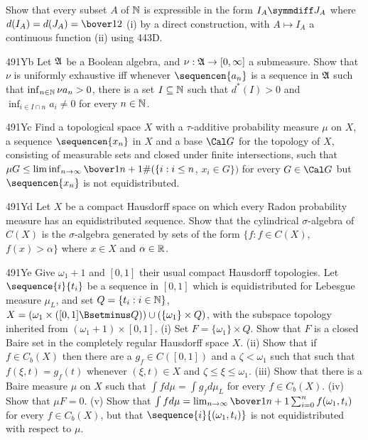 {
Show that every subset $A$ of $\Bbb N$ is expressible in
the form $I_A\symmdiff J_A$ where $d(I_A)=d(J_A)=\bover12$ (i) by a
direct construction, with
$A\mapsto I_A$ a continuous function (ii) using 443D.

\spheader 491Yb Let $\frak A$ be a Boolean algebra, and
$\nu:\frak A\to[0,\infty]$ a submeasure.   Show that $\nu$ is uniformly
exhaustive iff whenever $\sequencen{a_n}$ is a sequence in $\frak A$ such
that $\inf_{n\in\Bbb N}\nu a_n>0$, there is a set $I\subseteq\Bbb N$ such
that $d^*(I)>0$ and $\inf_{i\in I\cap n}a_i\ne 0$ for every $n\in\Bbb N$.

\spheader 491Yc
Find a topological space $X$ with a $\tau$-additive probability
measure
$\mu$ on $X$, a sequence $\sequencen{x_n}$ in $X$ and a base $\Cal G$
for the topology of
$X$, consisting of measurable sets and closed under finite
intersections, such that
$\mu G\le\liminf_{n\to\infty}\bover1{n+1}\#(\{i:i\le n$, $x_i\in G\})$
for every $G\in\Cal G$ but $\sequencen{x_n}$ is not equidistributed.

\spheader 491Yd Let $X$ be a compact Hausdorff space on which every
Radon probability measure has an equidistributed sequence.   Show that
the cylindrical $\sigma$-algebra of
$C(X)$ is the $\sigma$-algebra generated by sets of the form
$\{f:f\in C(X)$, $f(x)>\alpha\}$ where $x\in X$ and $\alpha\in\Bbb R$.

\spheader 491Ye Give $\omega_1+1$ and $[0,1]$ their usual compact
Hausdorff topologies.   Let $\sequence{i}{t_i}$ be a sequence in
$[0,1]$
which is equidistributed for
Lebesgue measure $\mu_L$, and set $Q=\{t_i:i\in\Bbb N\}$,
$X=(\omega_1\times([0,1]\Bsetminus Q))\cup(\{\omega_1\}\times Q)$,
with the subspace topology inherited from $(\omega_1+1)\times[0,1]$.
(i) Set $F=\{\omega_1\}\times Q$.   Show that
$F$ is a closed Baire set in the completely regular Hausdorff space
$X$.
(ii) Show that if $f\in C_b(X)$ then there are a $g_f\in C([0,1])$
and a
$\zeta<\omega_1$ such that
such that $f(\xi,t)=g_f(t)$ whenever $(\xi,t)\in X$ and
$\zeta\le\xi\le\omega_1$.   (iii) Show that there is a Baire measure
$\mu$ on $X$ such that $\int fd\mu=\int g_fd\mu_L$ for every
$f\in C_b(X)$.   (iv) Show that $\mu F=0$.   (v) Show that
$\int fd\mu=\lim_{n\to\infty}\bover1{n+1}\sum_{i=0}^nf(\omega_1,t_i)$
for every $f\in C_b(X)$, but that $\sequence{i}{(\omega_1,t_i)}$ is not
equidistributed with respect to $\mu$.

}
